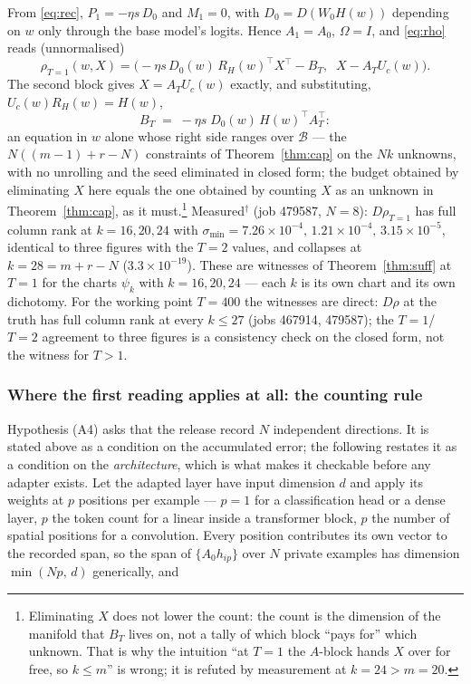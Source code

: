 \begin{example}[$T=1$, closed form]\label{ex:T1}
From \eqref{eq:rec}, $P_1=-\eta s\,D_0$ and $M_1=0$, with
$D_0=D(W_0H(w))$ depending on $w$ only through the base model's logits.
Hence $A_1=A_0$, $\Omega=I$, and \eqref{eq:rho} reads (unnormalised)
\[
  \rho_{T=1}(w,X)=\bigl(-\eta s\,D_0(w)\,R_H(w)^{\!\top}X^{\!\top}-B_T,\;\;X-A_TU_c(w)\bigr).
\]
The second block gives $X=A_TU_c(w)$ exactly, and substituting,
$U_c(w)R_H(w)=H(w)$,
\begin{equation}\label{eq:T1}
  B_T\;=\;-\eta s\;D_0(w)\,H(w)^{\!\top}A_T^{\!\top}:
\end{equation}
an equation in $w$ alone whose right side ranges over $\mathcal B$ — the
$N((m-1)+r-N)$ constraints of Theorem~\ref{thm:cap} on the $Nk$ unknowns,
with no unrolling and the seed eliminated in closed form; the budget obtained
by eliminating $X$ here equals the one obtained by counting $X$ as an unknown
in Theorem~\ref{thm:cap}, as it must.\footnote{Eliminating
$X$ does not lower the count: the count is the dimension of the manifold that
$B_T$ lives on, not a tally of which block ``pays for'' which unknown. That is
why the intuition ``at $T=1$ the $A$-block hands $X$ over for free, so
$k\le m$'' is wrong; it is refuted by measurement at $k=24>m=20$.}
Measured$^\dagger$ (job 479587, $N=8$): $D\rho_{T=1}$ has full column rank
at $k=16,20,24$ with $\sigma_{\min}=7.26\times10^{-4},\,1.21\times10^{-4},\,3.15\times10^{-5}$,
identical to three figures with the $T=2$ values, and collapses at $k=28=m+r-N$
($3.3\times10^{-19}$). These are witnesses of Theorem~\ref{thm:suff} at
$T=1$ for the charts $\psi_k$ with $k=16,20,24$ — each $k$ is its own chart
and its own dichotomy. For the working point $T=400$ the witnesses are
direct: $D\rho$ at the truth has full column rank at every $k\le27$ (jobs
467914, 479587); the $T=1$/$T=2$ agreement to three figures is a consistency
check on the closed form, not the witness for $T>1$.
\end{example}

\subsubsection*{Where the first reading applies at all: the counting rule}

Hypothesis (A4) asks that the release record $N$ independent directions. It is
stated above as a condition on the accumulated error; the following restates it
as a condition on the \emph{architecture}, which is what makes it checkable
before any adapter exists. Let the adapted layer have input dimension $d$ and
apply its weights at $p$ positions per example --- $p=1$ for a classification
head or a dense layer, $p$ the token count for a linear inside a transformer
block, $p$ the number of spatial positions for a convolution. Every position
contributes its own vector to the recorded span, so the span of $\{A_0h_{ip}\}$
over $N$ private examples has dimension $\min(Np,\,d)$ generically, and

